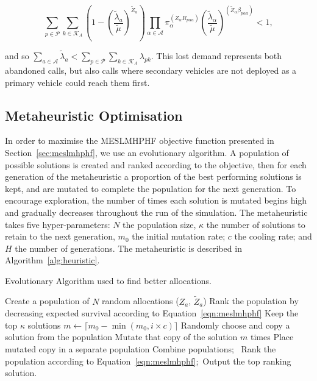 \documentclass[numbers,webpdf,imaman]{ima-authoring-template}%
\begin{document}
$$\sum_{p \in \mathcal{P}} \sum_{k \in \mathcal{K}_A} \left( 1 - \left(\frac{\tilde{\lambda}_a}{\tilde{\mu}}\right)^{\tilde{Z}_a} \right) \prod_{\alpha \in \mathcal{A}} \pi_{\alpha}^{\left(Z_{\alpha} R_{p \alpha a}\right)} \left(\frac{\tilde{\lambda}_{\alpha}}{\tilde{\mu}}\right)^{ \left(\tilde{Z}_{\alpha} \beta_{p \alpha a}\right)} < 1,$$

\noindent
and so
$\sum_{a \in \mathcal{A}} \tilde{\lambda}_a < \sum_{p \in \mathcal{P}} \sum_{k \in \mathcal{K}_A} \lambda_{pk}$.
This lost demand represents both abandoned calls, but also calls where secondary
vehicles are not deployed as a primary vehicle could reach them first.



\subsection{Metaheuristic Optimisation}\label{sec:heuristic}
In order to maximise the MESLMHPHF objective function presented in
Section~\ref{sec:meslmhphf}, we use an evolutionary algorithm. A population of
possible solutions is created and ranked according to the objective, then for
each generation of the metaheuristic a proportion of the best performing
solutions is kept, and are mutated to complete the population for the next
generation. To encourage exploration, the number of times each solution is
mutated begins high and gradually decreases throughout the run of the
simulation. The metaheuristic takes five hyper-parameters: $N$ the population
size, $\kappa$ the number of solutions to retain to the next generation, $m_0$
the initial mutation rate; $c$ the cooling rate; and $H$ the number of
generations. The metaheuristic is described in Algorithm~\ref{alg:heuristic}.

\begin{algorithm}
\algnewcommand{}
\caption{Evolutionary Algorithm used to find better allocations.}
\label{alg:heuristic}
\begin{algorithmic}[1]
\State Create a population of $N$ random allocations ($Z_a$, $\tilde{Z}_a$)\;
  \State Rank the population by decreasing expected survival according to Equation~\ref{eqn:meslmhphf}\;
  \State Keep the top $\kappa$ solutions\;
  \State $m \leftarrow \lceil m_0 - \min\left(m_0, i \times c\right)\rceil$\;
    \State Randomly choose and copy a solution from the population\;
    \State Mutate that copy of the solution $m$ times\;
    \State Place mutated copy in a separate population\;
  \EndFor
  \State Combine populations;\
\EndFor
\State Rank the population according to Equation~\ref{eqn:meslmhphf};\
\State Output the top ranking solution.
\end{algorithmic}
\end{algorithm}
\end{document}
